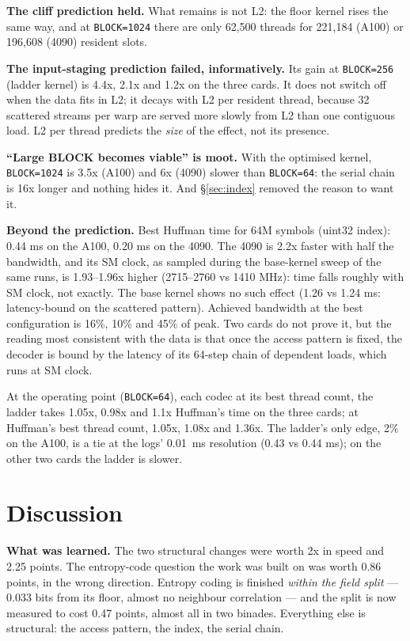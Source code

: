 \documentclass[11pt,a4paper]{article}
\newcommand{\code}[1]{\texttt{#1}}
\newcommand{\B}[1]{\textbf{#1}}
\begin{document}
\B{The cliff prediction held.} What remains is not L2: the floor kernel rises the same way, and at \code{BLOCK=1024} there are only 62,500 threads for 221,184 (A100) or 196,608 (4090) resident slots.

\B{The input-staging prediction failed, informatively.} Its gain at \code{BLOCK=256} (ladder kernel) is 4.4x, 2.1x and 1.2x on the three cards. It does not switch off when the data fits in L2; it decays with L2 per resident thread, because 32 scattered streams per warp are served more slowly from L2 than one contiguous load. L2 per thread predicts the \emph{size} of the effect, not its presence.

\B{``Large BLOCK becomes viable'' is moot.} With the optimised kernel, \code{BLOCK=1024} is 3.5x (A100) and 6x (4090) slower than \code{BLOCK=64}: the serial chain is 16x longer and nothing hides it. And \S\ref{sec:index} removed the reason to want it.

\B{Beyond the prediction.} Best Huffman time for 64M symbols (uint32 index): 0.44 ms on the A100, 0.20 ms on the 4090. The 4090 is 2.2x faster with half the bandwidth, and its SM clock, as sampled during the base-kernel sweep of the same runs, is 1.93--1.96x higher (2715--2760 vs 1410 MHz): time falls roughly with SM clock, not exactly. The base kernel shows no such effect (1.26 vs 1.24 ms: latency-bound on the scattered pattern). Achieved bandwidth at the best configuration is 16\%, 10\% and 45\% of peak. Two cards do not prove it, but the reading most consistent with the data is that once the access pattern is fixed, the decoder is bound by the latency of its 64-step chain of dependent loads, which runs at SM clock.

At the operating point (\code{BLOCK=64}), each codec at its best thread count, the ladder takes 1.05x, 0.98x and 1.1x Huffman's time on the three cards; at Huffman's best thread count, 1.05x, 1.08x and 1.36x. The ladder's only edge, 2\% on the A100, is a tie at the logs' 0.01~ms resolution (0.43 vs 0.44 ms); on the other two cards the ladder is slower.

\section{Discussion}\label{sec:disc}

\B{What was learned.} The two structural changes were worth 2x in speed and 2.25 points. The entropy-code question the work was built on was worth 0.86 points, in the wrong direction. Entropy coding is finished \emph{within the field split} --- 0.033 bits from its floor, almost no neighbour correlation --- and the split is now measured to cost 0.47 points, almost all in two binades. Everything else is structural: the access pattern, the index, the serial chain.
\end{document}
